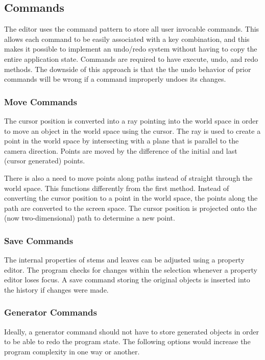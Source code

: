 \documentclass[10pt]{article}
\begin{document}
\subsection{Commands}
The editor uses the command pattern to store all user invocable commands. This allows each command to be easily associated with a key combination, and this makes it possible to implement an undo/redo system without having to copy the entire application state. Commands are required to have execute, undo, and redo methods. The downside of this approach is that the the undo behavior of prior commands will be wrong if a command improperly undoes its changes.

\subsubsection{Move Commands}
The cursor position is converted into a ray pointing into the world space in order to move an object in the world space using the cursor. The ray is used to create a point in the world space by intersecting with a plane that is parallel to the camera direction. Points are moved by the difference of the initial and last (cursor generated) points.

There is also a need to move points along paths instead of straight through the world space. This functions differently from the first method. Instead of converting the cursor position to a point in the world space, the points along the path are converted to the screen space. The cursor position is projected onto the (now two-dimensional) path to determine a new point.

\subsubsection{Save Commands}
The internal properties of stems and leaves can be adjusted using a property editor. The program checks for changes within the selection whenever a property editor loses focus. A save command storing the original objects is inserted into the history if changes were made.

\subsubsection{Generator Commands}
Ideally, a generator command should not have to store generated objects in order to be able to redo the program state. The following options would increase the program complexity in one way or another.
\end{document}
